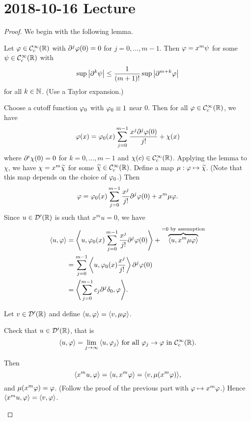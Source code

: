 \section{2018-10-16 Lecture}

\begin{proof}
  We begin with the following lemma.

  \begin{exer}
    Let $\varphi\in\mathcal{C}_c^\infty(\mathbb{R})$ with $\partial^j\varphi(0)=0$ for $j=0,\ldots,m-1$.
    Then $\varphi=x^m\psi$ for some $\psi\in\mathcal{C}_c^\infty(\mathbb{R})$ with
    \[ \sup\left\lvert \partial^k\psi \right\rvert \leq \frac{1}{(m+1)!} \sup\left\lvert \partial^{m+k}\varphi \right\rvert \]
    for all $k\in\mathbb{N}$.
    (Use a Taylor expansion.)
  \end{exer}
  
  \begin{enum}
    \io Choose a cutoff function $\varphi_0$ with $\varphi_0\equiv1$ near 0.
    Then for all $\varphi\in\mathcal{C}_c^\infty(\mathbb{R})$, we have
    \[ \varphi(x) = \varphi_0(x) \sum_{j=0}^{m-1} \frac{x^j\partial^j\varphi(0)}{j!} + \chi(x) \]
    where $\partial^i\chi(0)=0$ for $k=0,\ldots,m-1$ and $\chi(c)\in\mathcal{C}_c^\infty(\mathbb{R})$.
    Applying the lemma to $\chi$, we have $\chi=x^m\widetilde\chi$ for some $\widetilde\chi\in\mathcal{C}_c^\infty(\mathbb{R})$.
    Define a map $\mu:\varphi\mapsto\widetilde\chi$.
    (Note that this map depends on the choice of $\varphi_0$.)
    Then
    \[ \varphi = \varphi_0(x) \sum_{j=0}^{m-1} \frac{x^j}{j!} \partial^j\varphi(0) + x^m\mu\varphi. \]
    Since $u\in\mathcal{D}'(\mathbb{R})$ is such that $x^mu=0$, we have
    \begin{align*}
      {\left\langle u,\varphi\right\rangle} &= {\left\langle u, \varphi_0(x) \sum_{j=0}^{m-1} \frac{x^j}{j!} \partial^j\varphi(0) \right\rangle} + \overbrace{{\left\langle u, x^m\mu\varphi \right\rangle}}^{=0 \text{ by assumption}} \\
      &= \sum_{j=0}^{m-1} {\left\langle u,\varphi_0(x)\frac{x^j}{j!} \right\rangle} \, \partial^j\varphi(0) \\
      &= {\left\langle \sum_{j=0}^{m-1} c_j\partial^j\delta_0, \varphi \right\rangle}.
    \end{align*}

    \io Let $v\in\mathcal{D}'(\mathbb{R})$ and define ${\left\langle u,\varphi \right\rangle}={\left\langle v,\mu\varphi \right\rangle}$.
    \begin{exer}
      Check that $u\in\mathcal{D}'(\mathbb{R})$, that is
      \[ {\left\langle u,\varphi \right\rangle} = \lim_{j\to\infty}{\left\langle u,\varphi_j \right\rangle} \text{ for all } \varphi_j\to\varphi \text{ in } \mathcal{C}_c^\infty(\mathbb{R}). \]
    \end{exer}

    Then
    \[ {\left\langle x^mu,\varphi \right\rangle} = {\left\langle u,x^m\varphi \right\rangle} = {\left\langle v,\mu(x^m\varphi) \right\rangle}, \]
    and $\mu(x^m\varphi)=\varphi$.
    (Follow the proof of the previous part with $\varphi\mapsto x^m\varphi$.)
    Hence ${\left\langle x^mu,\varphi \right\rangle}={\left\langle v,\varphi \right\rangle}$.
    \qedhere
  \end{enum}
\end{proof}

